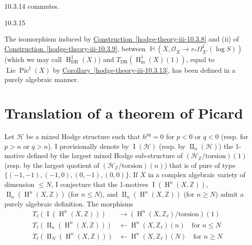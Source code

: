 \begin{exercise}{10.3.14}
    commutes.\end{exercise}\begin{remark}{10.3.15}\label{hodge-theory-iii-10.3.15}\skipsinglepar\par{}The isomorphism induced by \hyperref[hodge-theory-iii-10.3.8]{Construction~\ref*{hodge-theory-iii-10.3.8}} and (ii) of \hyperref[hodge-theory-iii-10.3.9]{Construction~\ref*{hodge-theory-iii-10.3.9}}, between \(\operatorname {\mathbb {H}}(\overline {X},\mathcal {O}_{\overline {X}}\to  r_*\Omega _{\overline {X}'}^1(\log  S))\) (which we may call \(\operatorname {H}_\mathrm {DR}^1(X)\)) and \(T_\mathrm {DR}(\operatorname {H}_\mathrm {m}^1(X)(1))\), equal to \(\operatorname {Lie}\operatorname {Pic}^\natural (X)\) by \hyperref[hodge-theory-iii-10.3.13]{Corollary~\ref*{hodge-theory-iii-10.3.13}}, has been defined in a purely algebraic manner.\end{remark}\section{Translation of a theorem of Picard}\label{hodge-theory-iii-10.4}\label{hodge-theory-iii-10.4.1}\par{}Let \(\mathscr {H}\) be a mixed Hodge structure such that \(h^{pq}=0\) for \(p<0\) or \(q<0\) (resp. for \(p>n\) or \(q>n\)).
    I provisionally denote by \(\operatorname {I}(\mathscr {H})\) (resp. by \(\operatorname {II}_n(\mathscr {H})\)) the 1-motive defined by the largest mixed Hodge sub-structure of \((\mathscr {H}_\mathbb {Z}{/}\mathrm {torsion})(1)\) (resp. by the largest quotient of \((\mathscr {H}_\mathbb {Z}{/}\mathrm {torsion})(n)\)) that is of pure of type
    \(       \big \{ (-1,-1), (-1,0), (0,-1), (0,0) \big \}.     \)
    If \(X\) in a complex algebraic variety of dimension \(\leqslant  N\), I conjecture that the 1-motives \(\operatorname {I}(\operatorname {H}^n(X,\mathbb {Z}))\), \(\operatorname {II}_n(\operatorname {H}^n(X,\mathbb {Z}))\) (for \(n\leqslant  N\)), and \(\operatorname {II}_n(\operatorname {H}^n(X,\mathbb {Z}))\) (for \(n\geqslant  N\)) admit a purely algebraic definition.
    The morphisms
    \[       \begin {aligned}         T_\ell (\operatorname {I}(\operatorname {H}^n(X,\mathbb {Z})))         & \to  (\operatorname {H}^n(X,\mathbb {Z}_\ell )/\mathrm {torsion})(1)       \\T_\ell (\operatorname {II}_n(\operatorname {H}^n(X,\mathbb {Z})))         & \leftarrow  \operatorname {H}^n(X,\mathbb {Z}_\ell )(n)           \quad \text {for }n\leqslant  N       \\T_\ell (\operatorname {II}_N(\operatorname {H}^n(X,\mathbb {Z})))         & \leftarrow  \operatorname {H}^n(X,\mathbb {Z}_\ell )(N)           \quad \text {for }n\geqslant  N       \end {aligned}     \]
